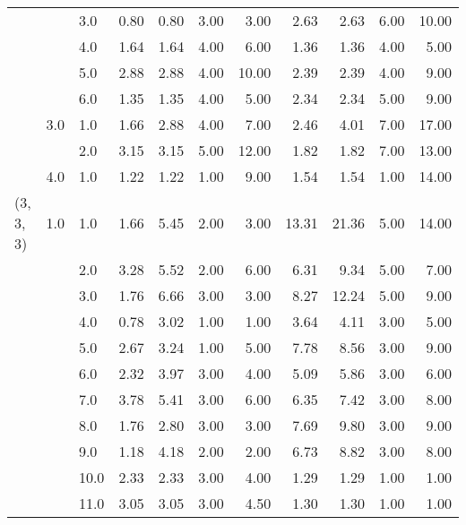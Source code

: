 \begin{tabular}{lllrrrrrrrr}
          &     & 3.0  &       0.80 &      0.80 &  3.00 &   3.00 &       2.63 &      2.63 &  6.00 &  10.00 \\
          &     & 4.0  &       1.64 &      1.64 &  4.00 &   6.00 &       1.36 &      1.36 &  4.00 &   5.00 \\
          &     & 5.0  &       2.88 &      2.88 &  4.00 &  10.00 &       2.39 &      2.39 &  4.00 &   9.00 \\
          &     & 6.0  &       1.35 &      1.35 &  4.00 &   5.00 &       2.34 &      2.34 &  5.00 &   9.00 \\
          & 3.0 & 1.0  &       1.66 &      2.88 &  4.00 &   7.00 &       2.46 &      4.01 &  7.00 &  17.00 \\
          &     & 2.0  &       3.15 &      3.15 &  5.00 &  12.00 &       1.82 &      1.82 &  7.00 &  13.00 \\
          & 4.0 & 1.0  &       1.22 &      1.22 &  1.00 &   9.00 &       1.54 &      1.54 &  1.00 &  14.00 \\
(3, 3, 3) & 1.0 & 1.0  &       1.66 &      5.45 &  2.00 &   3.00 &      13.31 &     21.36 &  5.00 &  14.00 \\
          &     & 2.0  &       3.28 &      5.52 &  2.00 &   6.00 &       6.31 &      9.34 &  5.00 &   7.00 \\
          &     & 3.0  &       1.76 &      6.66 &  3.00 &   3.00 &       8.27 &     12.24 &  5.00 &   9.00 \\
          &     & 4.0  &       0.78 &      3.02 &  1.00 &   1.00 &       3.64 &      4.11 &  3.00 &   5.00 \\
          &     & 5.0  &       2.67 &      3.24 &  1.00 &   5.00 &       7.78 &      8.56 &  3.00 &   9.00 \\
          &     & 6.0  &       2.32 &      3.97 &  3.00 &   4.00 &       5.09 &      5.86 &  3.00 &   6.00 \\
          &     & 7.0  &       3.78 &      5.41 &  3.00 &   6.00 &       6.35 &      7.42 &  3.00 &   8.00 \\
          &     & 8.0  &       1.76 &      2.80 &  3.00 &   3.00 &       7.69 &      9.80 &  3.00 &   9.00 \\
          &     & 9.0  &       1.18 &      4.18 &  2.00 &   2.00 &       6.73 &      8.82 &  3.00 &   8.00 \\
          &     & 10.0 &       2.33 &      2.33 &  3.00 &   4.00 &       1.29 &      1.29 &  1.00 &   1.00 \\
          &     & 11.0 &       3.05 &      3.05 &  3.00 &   4.50 &       1.30 &      1.30 &  1.00 &   1.00 \\

\end{tabular}
